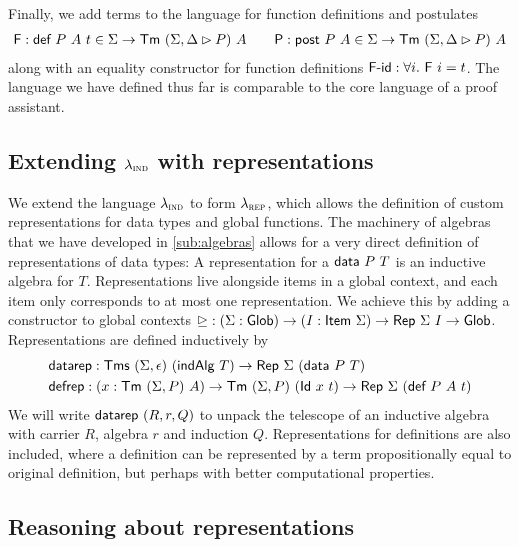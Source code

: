 Finally, we add terms to the language for function definitions and postulates
\begin{align*}
	\textsf{F} : \textsf{def}\ P\ A\ t \in \Sigma \to \textsf{Tm}\ (\Sigma, \Delta \rhd P)\ A \qquad \textsf{P} : \textsf{post}\ P\ A \in \Sigma \to \textsf{Tm}\ (\Sigma, \Delta \rhd P)\ A
\end{align*}
along with an equality constructor for function definitions $\textsf{F-id} : \forall i.\ \textsf{F}\ i = t$.
The language we have defined thus far is comparable to the core language of a
proof assistant.

\subsection{Extending $\lambda_{\textsc{ind}}$ with representations} \label{sub:lambdarep}

We extend the language $\lambda_{\textsc{ind}}$ to form $\lambda_{\textsc{rep}}$, which allows the
definition of custom representations for data types and global functions. The
machinery of algebras that we have developed in \cref{sub:algebras} allows for a
very direct definition of representations of data types: A representation for a
$\textsf{data}\ P\ T$ is an inductive algebra for $T$.
Representations live alongside items in a global context, and each item only corresponds
to at most one representation. We achieve this by adding a constructor to global contexts
$\unrhd : (\Sigma : \textsf{Glob}) \to (I : \textsf{Item}\ \Sigma) \to \textsf{Rep}\ \Sigma\ I \to \textsf{Glob}$.
Representations are defined inductively by
\begin{align*}
& \textsf{datarep} : \textsf{Tms}\ (\Sigma, \epsilon)\ (\textsf{indAlg}\ T) \to \textsf{Rep}\ \Sigma\ (\textsf{data}\ P\ T) \\
& \textsf{defrep} : (x : \textsf{Tm}\ (\Sigma, P)\ A) \to \textsf{Tm}\ (\Sigma, P)\ (\textsf{Id}\ x\ t) \to \textsf{Rep}\ \Sigma\ (\textsf{def}\ P\ A\ t)
\end{align*}
We will write $\textsf{datarep}\ (R, r, Q)$ to unpack the telescope of an inductive
algebra with carrier $R$, algebra $r$ and induction
$Q$. Representations for definitions are also included, where a definition can
be represented by a term propositionally equal to original definition, but
perhaps with better computational properties.

\subsection{Reasoning about representations} \label{sub:reasoningrep}

